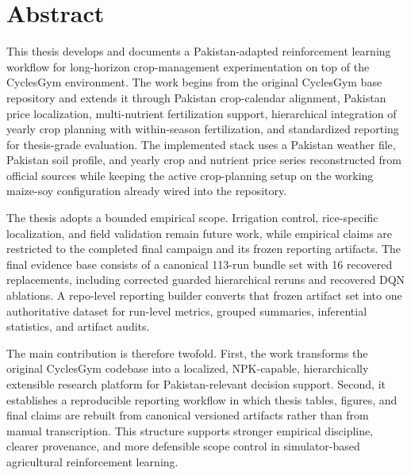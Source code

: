 \chapter*{Abstract}
\thispagestyle{empty}
This thesis develops and documents a Pakistan-adapted reinforcement learning workflow for long-horizon crop-management experimentation on top of the CyclesGym environment. The work begins from the original CyclesGym base repository and extends it through Pakistan crop-calendar alignment, Pakistan price localization, multi-nutrient fertilization support, hierarchical integration of yearly crop planning with within-season fertilization, and standardized reporting for thesis-grade evaluation. The implemented stack uses a Pakistan weather file, Pakistan soil profile, and yearly crop and nutrient price series reconstructed from official sources while keeping the active crop-planning setup on the working maize-soy configuration already wired into the repository.

The thesis adopts a bounded empirical scope. Irrigation control, rice-specific localization, and field validation remain future work, while empirical claims are restricted to the completed final campaign and its frozen reporting artifacts. The final evidence base consists of a canonical 113-run bundle set with 16 recovered replacements, including corrected guarded hierarchical reruns and recovered DQN ablations. A repo-level reporting builder converts that frozen artifact set into one authoritative dataset for run-level metrics, grouped summaries, inferential statistics, and artifact audits.

The main contribution is therefore twofold. First, the work transforms the original CyclesGym codebase into a localized, NPK-capable, hierarchically extensible research platform for Pakistan-relevant decision support. Second, it establishes a reproducible reporting workflow in which thesis tables, figures, and final claims are rebuilt from canonical versioned artifacts rather than from manual transcription. This structure supports stronger empirical discipline, clearer provenance, and more defensible scope control in simulator-based agricultural reinforcement learning.
\clearpage
